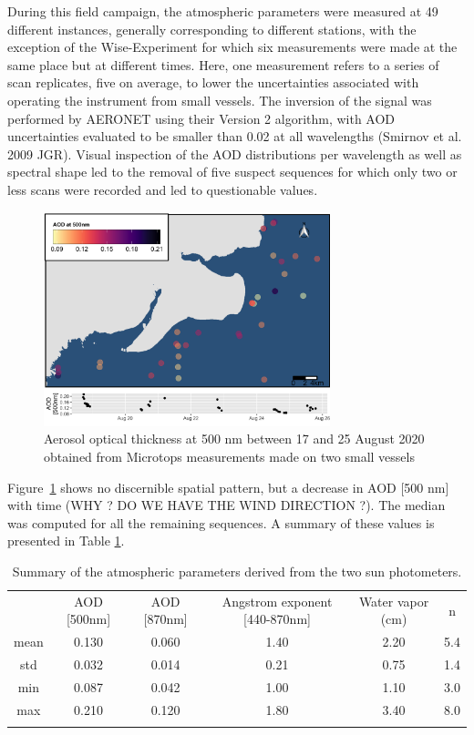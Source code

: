 \documentclass[essd, manuscript]{copernicus}
\begin{document}
During this field campaign, the atmospheric parameters were measured at 49 different instances, generally corresponding to different stations, with the exception of the Wise-Experiment for which six measurements were made at the same place but at different times. Here, one measurement refers to a series of scan replicates, five on average, to lower the uncertainties associated with operating the instrument from small vessels. The inversion of the signal was performed by AERONET using their Version 2 algorithm, with AOD uncertainties evaluated to be smaller than 0.02 at all wavelengths (Smirnov et al. 2009 JGR). Visual inspection of the AOD distributions per wavelength as well as spectral shape led to the removal of five suspect sequences for which only two or less scans were recorded and led to questionable values. 

\begin{figure}[t]
    \includegraphics[width=8.3cm]{Figures/fig_AOD.png}
    \caption{Aerosol optical thickness at 500 nm between 17 and 25 August 2020 obtained from Microtops measurements made on two small vessels }
    \label{fig:AOD}
\end{figure}

 
Figure~\ref{fig:AOD} shows no discernible spatial pattern, but a decrease in AOD [500 nm] with time (WHY ? DO WE HAVE THE WIND DIRECTION ?). The median was computed for all the remaining sequences. A summary of these values is presented in Table \ref{table:AOT}. 
 

\begin{table}[t]
\caption{Summary of the atmospheric parameters derived from the two sun photometers.}
\centering
\begin{tabular}{ cccccc  }
\tophline
 & AOD [500nm] & AOD [870nm] & Angstrom exponent [440-870nm] & Water vapor (cm) & n\\
\middlehline
mean & 0.130 & 0.060 & 1.40 & 2.20 & 5.4 \\
std & 0.032 & 0.014 & 0.21 & 0.75 & 1.4 \\
min & 0.087 & 0.042 & 1.00 & 1.10 & 3.0 \\
max & 0.210 & 0.120 & 1.80 & 3.40 & 8.0 \\
\bottomhline
 \end{tabular}
 \label{table:AOT}
\end{table}
\end{document}
